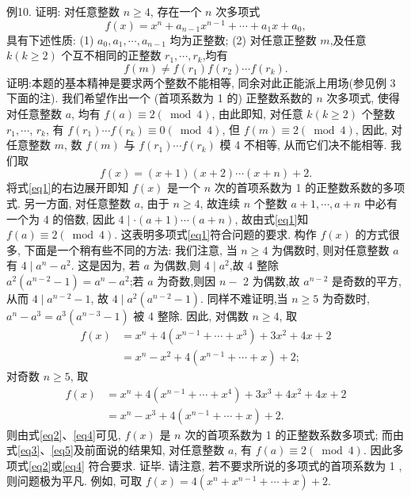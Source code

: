 例10. 证明: 对任意整数 $n \geqslant 4$, 存在一个 $n$ 次多项式
$$
f(x)=x^n+a_{n-1} x^{n-1}+\cdots+a_1 x+a_0,
$$
具有下述性质:
(1) $a_0, a_1, \cdots, a_{n-1}$ 均为正整数;
(2) 对任意正整数 $m$,及任意 $k(k \geqslant 2)$ 个互不相同的正整数 $r_1, \cdots, r_k$,均有
$$
f(m) \neq f\left(r_1\right) f\left(r_2\right) \cdots f\left(r_k\right) .
$$
证明:本题的基本精神是要求两个整数不能相等, 同余对此正能派上用场(参见例 3 下面的注).
我们希望作出一个 (首项系数为 1 的) 正整数系数的 $n$ 次多项式, 使得对任意整数 $a$, 均有 $f(a) \equiv 2(\bmod 4)$, 由此即知, 对任意 $k(k \geqslant 2)$ 个整数 $r_1, \cdots$,
$r_k$, 有 $f\left(r_1\right) \cdots f\left(r_k\right) \equiv 0(\bmod 4)$, 但 $f(m) \equiv 2(\bmod 4)$, 因此, 对任意整数 $m$, 数 $f(m)$ 与 $f\left(r_1\right) \cdots f\left(r_k\right)$ 模 4 不相等, 从而它们决不能相等.
我们取
$$
f(x)=(x+1)(x+2) \cdots(x+n)+2 . \label{eq1}
$$
将式\ref{eq1}的右边展开即知 $f(x)$ 是一个 $n$ 次的首项系数为 1 的正整数系数的多项式.
另一方面, 对任意整数 $a$, 由于 $n \geqslant 4$, 故连续 $n$ 个整数 $a+1, \cdots, a+n$ 中必有一个为 4 的倍数, 因此 $4 \mid \cdot(a+1) \cdots(a+n)$, 故由式\ref{eq1}知 $f(a) \equiv 2(\bmod 4)$. 这表明多项式\ref{eq1}符合问题的要求.
构作 $f(x)$ 的方式很多, 下面是一个稍有些不同的方法:
我们注意, 当 $n \geqslant 4$ 为偶数时, 则对任意整数 $a$ 有 $4 \mid a^n-a^2$. 这是因为, 若 $a$ 为偶数,则 $4 \mid a^2$,故 4 整除 $a^2\left(a^{n-2}-1\right)=a^n-a^2$;若 $a$ 为奇数,则因 $n-$ 2 为偶数,故 $a^{n-2}$ 是奇数的平方, 从而 $4 \mid a^{n-2}-1$, 故 $4 \mid a^2\left(a^{n-2}-1\right)$.
同样不难证明,当 $n \geqslant 5$ 为奇数时, $a^n-a^3=a^3\left(a^{n-3}-1\right)$ 被 4 整除.
因此, 对偶数 $n \geqslant 4$, 取
$$
\begin{aligned}
f(x) & =x^n+4\left(x^{n-1}+\cdots+x^3\right)+3 x^2+4 x+2 \label{eq2}\\
& =x^n-x^2+4\left(x^{n-1}+\cdots+x\right)+2 ;\label{eq3}
\end{aligned}
$$
对奇数 $n \geqslant 5$, 取
$$
\begin{aligned}
f(x) & =x^n+4\left(x^{n-1}+\cdots+x^4\right)+3 x^3+4 x^2+4 x+2 \label{eq4} \\
& =x^n-x^3+4\left(x^{n-1}+\cdots+x\right)+2 . \label{eq5}
\end{aligned}
$$
则由式\ref{eq2}、\ref{eq4}可见, $f(x)$ 是 $n$ 次的首项系数为 1 的正整数系数多项式; 而由式\ref{eq3}、\ref{eq5}及前面说的结果知, 对任意整数 $a$, 有 $f(a) \equiv 2(\bmod 4)$. 因此多项式\ref{eq2}或\ref{eq4} 符合要求.
证毕.
请注意, 若不要求所说的多项式的首项系数为 1 , 则问题极为平凡.
例如, 可取 $f(x)=4\left(x^n+x^{n-1}+\cdots+x\right)+2$.



